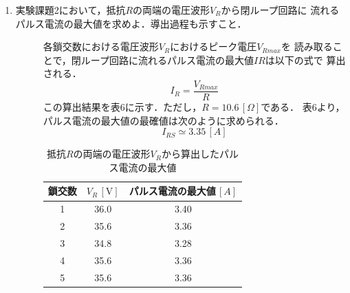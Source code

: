 \begin{enumerate}
    \item 実験課題2において，抵抗$R$の両端の電圧波形$V_R$から閉ループ回路に
    流れるパルス電流の最大値を求めよ．導出過程も示すこと．
    \begin{description}
        \item[] 各鎖交数における電圧波形$V_R$におけるピーク電圧$V_{Rmax}$を
        読み取ることで，閉ループ回路に流れるパルス電流の最大値$IR$は以下の式で
        算出される．
        $$
        I_R=\frac{V_{Rmax}}{R}
        $$
        この算出結果を表6に示す．ただし，$R= 10.6\,[\Omega]$である．
        表6より，パルス電流の最大値の最確値は次のように求められる．
        $$
        I_{RS}\simeq 3.35\,[\si{A}]
        $$
        \begin{table}[H]
            \centering
            \caption{抵抗$R$の両端の電圧波形$V_R$から算出したパルス電流の最大値}
            \begin{tabular}{c|c|c}
            \hline
                鎖交数 & $V_R\,[\si{\volt}]$ & パルス電流の最大値$\,[\si{A}]$ \\ \hline
                1 & 36.0 & 3.40 \\ 
                2 & 35.6 & 3.36 \\ 
                3 & 34.8 & 3.28 \\ 
                4 & 35.6 & 3.36 \\ 
                5 & 35.6 & 3.36 \\ \hline
            \end{tabular}
        \end{table}
    \end{description}
    

\end{enumerate}
